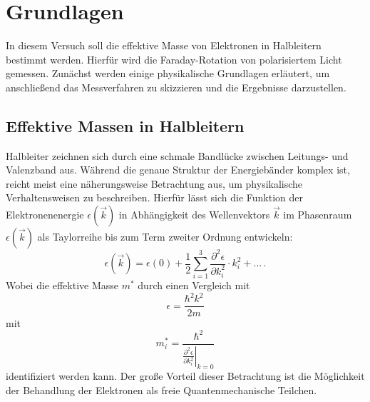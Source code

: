 \section{Grundlagen} %
\label{sec:grundlagen}
In diesem Versuch soll die effektive Masse von Elektronen in Halbleitern
bestimmt werden.
Hierfür wird die Faraday-Rotation von polarisiertem Licht gemessen.
Zunächst werden einige physikalische Grundlagen erläutert, um anschließend
das Messverfahren zu skizzieren und die Ergebnisse darzustellen.

\subsection{Effektive Massen in Halbleitern} %
\label{sub:effektive_masse}
Halbleiter zeichnen sich durch eine schmale Bandlücke zwischen Leitungs-
und Valenzband aus.
Während die genaue Struktur der Energiebänder komplex ist, reicht meist
eine näherungsweise Betrachtung aus, um physikalische Verhaltensweisen zu
beschreiben.
Hierfür lässt sich die Funktion der Elektronenenergie
$\epsilon\left(\vec{k}\right)$ in Abhängigkeit des Wellenvektors $\vec{k}$
im Phasenraum $\epsilon(\vec{k})$ als Taylorreihe bis zum Term zweiter Ordnung
entwickeln:
\begin{equation}
    \label{eqn:energie}
    \epsilon\left(\vec{k}\right) = \epsilon(0) + \frac{1}{2}\sum_{i=1}^{3}\frac{\partial^2\epsilon}{\partial k_i^2}\cdot k_i^2 + \dots\,.
\end{equation}
Wobei die effektive Masse $m^*$ durch einen Vergleich mit
\begin{equation*}
    \epsilon = \frac{\hbar^2 k^2}{2m}
\end{equation*}
mit
\begin{equation}
    m_i^* = \frac{\hbar^2}{\left.\frac{\partial^2\epsilon}{\partial k_i^2}\right|_{k=0}}
\end{equation}
identifiziert werden kann. Der große Vorteil dieser Betrachtung ist die
Möglichkeit der Behandlung der Elektronen als freie Quantenmechanische
Teilchen.
